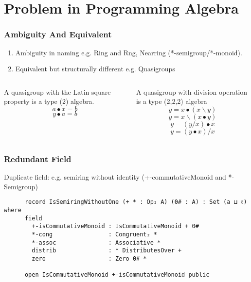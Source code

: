 \documentclass[xcolor={dvipsnames}]{beamer}
\begin{document}
\section{Problem in Programming Algebra}

\begin{frame}
  \frametitle{Ambiguity And Equivalent}
  \begin{enumerate}
    \item Ambiguity in naming e.g. Ring and Rng, Nearring (*-semigroup/*-monoid). 
    \item Equivalent but structurally different e.g. Quasigroups
  \end{enumerate}
  \begin{columns}
    \begin{column}{0.4\textwidth}
      A quasigroup with the Latin square property is a type (2) algebra.
      \[a ∙ x = b\]
      \[y ∙ a = b\]
    \end{column}
    \begin{column}{0.575\textwidth}
      A quasigroup with division operation is a type (2,2,2) algebra
      \[y=x∙(x\backslash y)\]
      \[y=x\backslash(x∙y)\]
      \[y=(y/x)∙x\]
      \[y=(y∙x)/x\]
    \end{column}
  \end{columns}
\end{frame}


\begin{frame}[fragile]
  \frametitle{Redundant Field}

  Duplicate field: e.g. semiring without identity (+-commutativeMonoid and *-Semigroup)

    \begin{verbatim}
      record IsSemiringWithoutOne (+ * : Op₂ A) (0# : A) : Set (a ⊔ ℓ) where
      field
        +-isCommutativeMonoid : IsCommutativeMonoid + 0#
        *-cong                : Congruent₂ *
        *-assoc               : Associative *
        distrib               : * DistributesOver +
        zero                  : Zero 0# *
      
      open IsCommutativeMonoid +-isCommutativeMonoid public
    \end{verbatim}
\end{frame}
\end{document}
